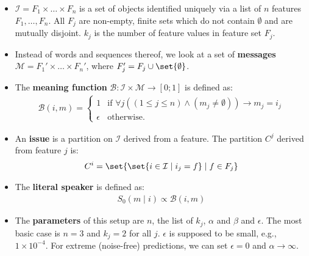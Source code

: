 \documentclass[fleqn,reqno,10pt]{article}
\begin{document}
\begin{itemize}
  \item $\mathcal{I} = F_{1} \times \dots \times F_{n}$ is a set of objects identified uniquely via a list of $n$ features $F_{1}, \dots, F_{n}$. All $F_{j}$ are non-empty, finite sets which do not contain $\emptyset$ and are mutually disjoint. $k_{j}$ is the number of feature values in feature set $F_{j}$.
  \item Instead of words and sequences thereof, we look at a set of \textbf{messages} $\mathcal{M} = F_{1}' \times \dots \times F_{n}'$, where $F_{j}' = F_{j} \cup \set{\emptyset}$.
  \item The \textbf{meaning function} $\mathcal{B} \colon \mathcal{I} \times \mathcal{M} \rightarrow [0;1]$ is defined as:
        \begin{align*}
          \mathcal{B}(i,m) =
          \begin{cases}
            1 & \text{if } \forall j ((1 \le j \le n) \wedge (m_j \neq \emptyset)) \rightarrow m_j = i_j
            \\
            \epsilon & \text{otherwise}.
          \end{cases}
        \end{align*}
  \item An \textbf{issue} is a partition on $\mathcal{I}$ derived from a feature. The partition $C^{j}$ derived from feature $j$ is:
        \begin{align*}
          C^i = \set{ \set{i \in \mathcal{I} \mid i_j = f} \mid f \in F_j}
        \end{align*}
  \item The \textbf{literal speaker} is defined as:
        \begin{align*}
          S_0(m \mid i) \propto \mathcal{B}(i,m)
        \end{align*}
  \item The \textbf{parameters} of this setup are $n$, the list of $k_{j}$, $\alpha$ and $\beta$ and $\epsilon$. The most basic case is $n=3$ and $k_{j}=2$ for all $j$. $\epsilon$ is supposed to be small, e.g., $1\times10^{-4}$. For extreme (noise-free) predictions, we can set $\epsilon = 0$ and $\alpha \rightarrow \infty$.
\end{itemize}

\printbibliography[heading=bibintoc]
\end{document}
